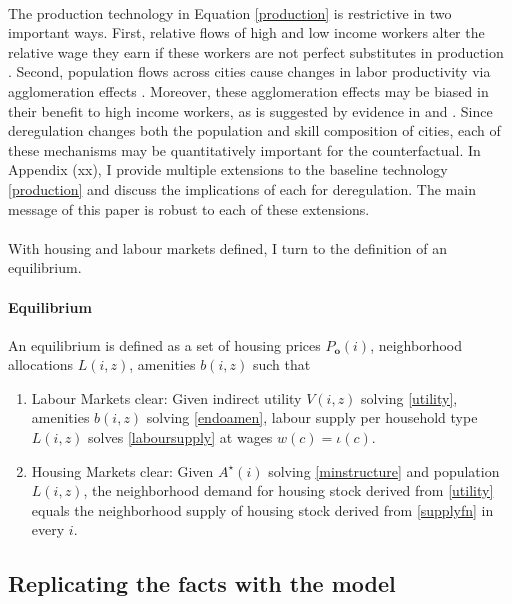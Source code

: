 \documentclass[11pt]{article}
\begin{document}
	\paragraph*{}
	 The production technology in Equation \eqref{production} is restrictive in two important ways. First, relative flows of high and low income workers alter the relative wage they earn if these workers are not perfect substitutes in production \citep{card}. Second, population flows across cities cause changes in labor productivity via agglomeration effects \citep{Combes_review}. Moreover, these agglomeration effects may be biased in their benefit to high income workers, as is suggested by evidence in \cite{diamond2016} and \cite{ineqincreased}. Since deregulation changes both the population and skill composition of cities, each of these mechanisms may be quantitatively important for the counterfactual. In Appendix (xx), I provide multiple extensions to the baseline technology \eqref{production} and discuss the implications of each for deregulation. The main message of this paper is robust to each of these extensions. 
 
	\paragraph*{}
	With housing and labour markets defined, I turn to the definition of an equilibrium.

	\paragraph*{Equilibrium} An equilibrium is defined as a set of housing prices $P_{\boldsymbol{o}}(i)$, neighborhood allocations $L(i, z)$, amenities $b(i, z)$ such that
	\begin{enumerate}
		\item Labour Markets clear: Given indirect utility $V(i, z)$ solving \eqref{utility}, amenities $b(i, z)$ solving \eqref{endoamen}, labour supply per household type $L(i, z)$ solves \eqref{laboursupply} at wages $w(c) = \iota(c)$.
	
		\item Housing Markets clear: Given $A^{\star}(i)$ solving \eqref{minstructure} and population $L(i, z)$, the neighborhood demand for housing stock derived from \eqref{utility} equals the neighborhood supply of housing stock derived from \eqref{supplyfn} in every $i$. 
	\end{enumerate}

	
\subsection{Replicating the facts with the model}\label{SubSection:ReplicatingFacts}
\end{document}
